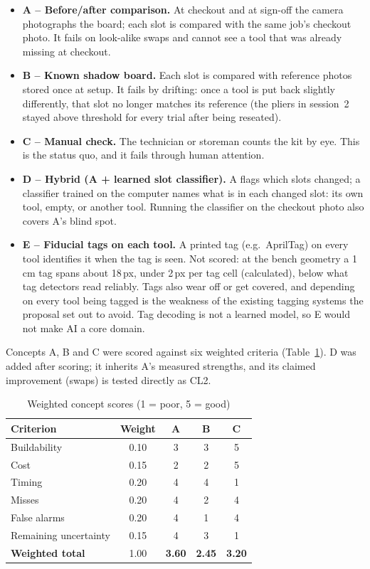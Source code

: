 \begin{itemize}
\item \textbf{A -- Before/after comparison.} At checkout and at sign-off the
camera photographs the board; each slot is compared with the same job's
checkout photo. It fails on look-alike swaps and cannot see a tool that was
already missing at checkout.
\item \textbf{B -- Known shadow board.} Each slot is compared with reference
photos stored once at setup. It fails by drifting: once a tool is put back
slightly differently, that slot no longer matches its reference (the pliers
in session~2 stayed above threshold for every trial after being reseated).
\item \textbf{C -- Manual check.} The technician or storeman counts the kit by
eye. This is the status quo, and it fails through human attention.
\item \textbf{D -- Hybrid (A + learned slot classifier).} A flags which slots
changed; a classifier trained on the computer names what is in each changed
slot: its own tool, empty, or another tool. Running the classifier on the
checkout photo also covers A's blind spot.
\item \textbf{E -- Fiducial tags on each tool.} A printed tag (e.g.\
AprilTag) on every tool identifies it when the tag is seen. Not scored:
at the bench geometry a 1\,cm tag spans about 18\,px, under 2\,px per tag
cell (calculated), below what tag detectors read reliably. Tags also wear
off or get covered, and depending on every tool being tagged is the weakness
of the existing tagging systems the proposal set out to avoid. Tag decoding
is not a learned model, so E would not make AI a core domain.
\end{itemize}

Concepts A, B and C were scored against six weighted criteria (Table~\ref{tab:scores}).
D was added after scoring; it inherits A's measured strengths, and its
claimed improvement (swaps) is tested directly as CL2.

\begin{table}[!t]
\centering
\footnotesize
\caption{Weighted concept scores (1 = poor, 5 = good)}
\label{tab:scores}
\begin{tabular}{@{}lcccc@{}}
\toprule
Criterion & Weight & A & B & C \\
\midrule
Buildability & 0.10 & 3 & 3 & 5 \\
Cost & 0.15 & 2 & 2 & 5 \\
Timing & 0.20 & 4 & 4 & 1 \\
Misses & 0.20 & 4 & 2 & 4 \\
False alarms & 0.20 & 4 & 1 & 4 \\
Remaining uncertainty & 0.15 & 4 & 3 & 1 \\
\midrule
\textbf{Weighted total} & 1.00 & \textbf{3.60} & \textbf{2.45} & \textbf{3.20} \\
\bottomrule
\end{tabular}
\end{table}


